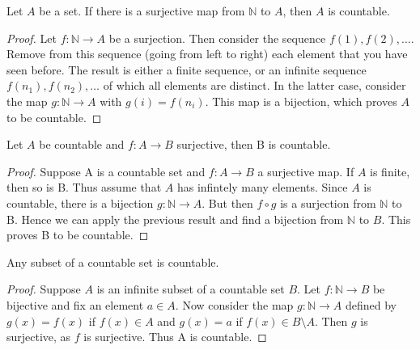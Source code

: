 \begin{theorem}
    Let $A$ be a set. If there is a surjective map from $ \mathbb{N} $ to $A$, then $A$ is countable.
\end{theorem}
\begin{proof}[Proof]
    Let $ f:\mathbb{N} \rightarrow A $ be a surjection. Then consider the sequence $ f(1), f(2), \dots $. Remove from this sequence (going from left to right) each element that you have seen before. The result is either a finite sequence,
    or an infinite sequence $ f(n_1), f(n_2), \dots $ of which all elements are distinct. In the latter case, consider the map
    $ g: \mathbb{N} \rightarrow A $ with $ g(i) = f(n_i) $. This map is a bijection, which proves $A$ to be countable.
\end{proof}
\begin{corollary}
    Let $A$ be countable and $ f : A \rightarrow B $ surjective, then B is countable.
\end{corollary}

\begin{proof}[Proof]
    Suppose A is a countable set and $ f: A \to B $ a surjective map. If $A$ is finite, then so is B.
    Thus assume that $A$ has infintely many elements. Since $A$ is countable, there is a bijection $ g: \mathbb{N} \to A $.
    But then $ f \circ g $ is a surjection from $ \mathbb{N} $ to B. Hence we can apply the previous result and find a bijection from $ \mathbb{N} $ to $B$. This proves B to be countable.
\end{proof}

\begin{theorem}
    Any subset of a countable set is countable.
\end{theorem}
\begin{proof}[Proof]
    Suppose $A$ is an infinite subset of a countable set $B$. Let $ f : \mathbb{N} \to B $ be bijective and fix an element $ a \in A $.
    Now consider the map $ g : \mathbb{N} \to A $ defined by $ g(x) = f(x) $ if $ f(x) \in A $ and $ g(x) = a $ if $ f(x) \in B \setminus A $.
    Then $g$ is surjective, as $f$ is surjective. Thus A is countable.
\end{proof}

